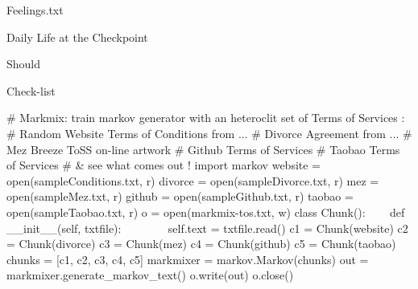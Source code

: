  Feelings.txt

 Daily Life at the Checkpoint

 Should

 Check-list

\# Markmix: train markov generator with an heteroclit set of Terms of
Services :\newline
\# Random Website Terms of Conditions from ...\newline
\# Divorce Agreement from ...\newline
\# Mez Breeze ToSS on-line artwork\newline
\# Github Terms of Services\newline
\# Taobao Terms of Services\newline
\# \& see what comes out !\newline
\newline
import markov\newline
\newline
website = open({\textquotedbl}sampleConditions.txt{\textquotedbl},
{\textquotedbl}r{\textquotedbl})\newline
divorce = open({\textquotedbl}sampleDivorce.txt{\textquotedbl},
{\textquotedbl}r{\textquotedbl})\newline
mez = open({\textquotedbl}sampleMez.txt{\textquotedbl},
{\textquotedbl}r{\textquotedbl})\newline
github = open({\textquotedbl}sampleGithub.txt{\textquotedbl},
{\textquotedbl}r{\textquotedbl})\newline
taobao = open({\textquotedbl}sampleTaobao.txt{\textquotedbl},
{\textquotedbl}r{\textquotedbl})\newline
o = open({\textquotedbl}markmix-tos.txt{\textquotedbl},
{\textquotedbl}w{\textquotedbl})\newline
\newline
class Chunk():\newline
~~~ def \_\_init\_\_(self, txtfile):\newline
~~~~~~~ self.text = txtfile.read()\newline
\newline
c1 = Chunk(website)\newline
c2 = Chunk(divorce)\newline
c3 = Chunk(mez)\newline
c4 = Chunk(github)\newline
c5 = Chunk(taobao)\newline
chunks = [c1, c2, c3, c4, c5]\newline
\newline
markmixer = markov.Markov(chunks)\newline
\newline
out = markmixer.generate\_markov\_text()\newline
\newline
o.write(out)\newline
o.close()

